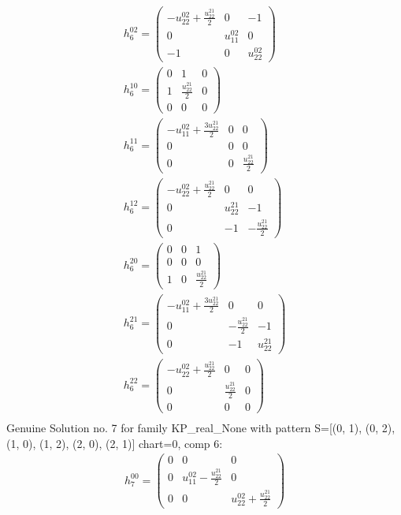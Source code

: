 \documentclass[a4paper, 11pt, twoside, onecolumn]{article}
\begin{document}
\begin{landscape}
\begin{gather*}
	 h_{6}^{02}=\begin{pmatrix}- u^{02}_{22} + \frac{u^{21}_{22}}{2} & 0 & -1\\0 & u^{02}_{11} & 0\\-1 & 0 & u^{02}_{22}\end{pmatrix}\\ 
	 h_{6}^{10}=\begin{pmatrix}0 & 1 & 0\\1 & \frac{u^{21}_{22}}{2} & 0\\0 & 0 & 0\end{pmatrix}\\ 
	 h_{6}^{11}=\begin{pmatrix}- u^{02}_{11} + \frac{3 u^{21}_{22}}{2} & 0 & 0\\0 & 0 & 0\\0 & 0 & \frac{u^{21}_{22}}{2}\end{pmatrix}\\ 
	 h_{6}^{12}=\begin{pmatrix}- u^{02}_{22} + \frac{u^{21}_{22}}{2} & 0 & 0\\0 & u^{21}_{22} & -1\\0 & -1 & - \frac{u^{21}_{22}}{2}\end{pmatrix}\\ 
	 h_{6}^{20}=\begin{pmatrix}0 & 0 & 1\\0 & 0 & 0\\1 & 0 & \frac{u^{21}_{22}}{2}\end{pmatrix}\\ 
	 h_{6}^{21}=\begin{pmatrix}- u^{02}_{11} + \frac{3 u^{21}_{22}}{2} & 0 & 0\\0 & - \frac{u^{21}_{22}}{2} & -1\\0 & -1 & u^{21}_{22}\end{pmatrix}\\ 
	 h_{6}^{22}=\begin{pmatrix}- u^{02}_{22} + \frac{u^{21}_{22}}{2} & 0 & 0\\0 & \frac{u^{21}_{22}}{2} & 0\\0 & 0 & 0\end{pmatrix}\\ 
\end{gather*} 
Genuine Solution no. 7 for family KP_real_None with pattern S=[(0, 1), (0, 2), (1, 0), (1, 2), (2, 0), (2, 1)] chart=0, comp 6: 
\begin{gather*} 
	 h_{7}^{00}=\begin{pmatrix}0 & 0 & 0\\0 & u^{02}_{11} - \frac{u^{21}_{22}}{2} & 0\\0 & 0 & u^{02}_{22} + \frac{u^{21}_{22}}{2}\end{pmatrix}\\ 

\end{gather*}
\end{landscape}
\end{document}
